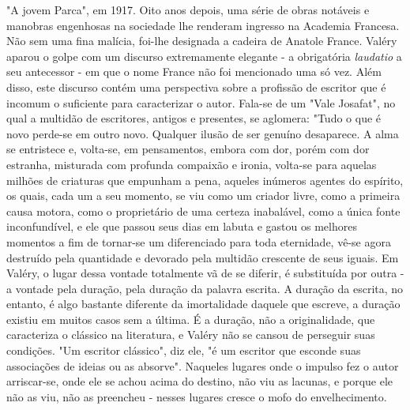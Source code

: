 "A jovem Parca", em 1917. Oito anos depois, uma série de obras notáveis
​​e manobras engenhosas na sociedade lhe renderam ingresso na Academia
Francesa. Não sem uma fina malícia, foi-lhe designada a cadeira de
Anatole France. Valéry aparou o golpe com um discurso extremamente
elegante - a obrigatória \emph{laudatio} a seu antecessor - em que o
nome France não foi mencionado uma só vez. Além disso, este discurso
contém uma perspectiva sobre a profissão de escritor que é incomum o
suficiente para caracterizar o autor. Fala-se de um "Vale Josafat", no
qual a multidão de escritores, antigos e presentes, se aglomera: "Tudo o
que é novo perde-se em outro novo. Qualquer ilusão de ser genuíno
desaparece. A alma se entristece e, volta-se, em pensamentos, embora com
dor, porém com dor estranha, misturada com profunda compaixão e ironia,
volta-se para aquelas milhões de criaturas que empunham a pena, aqueles
inúmeros agentes do espírito, os quais, cada um a seu momento, se viu
como um criador livre, como a primeira causa motora, como o proprietário
de uma certeza inabalável, como a única fonte inconfundível, e ele que
passou seus dias em labuta e gastou os melhores momentos a fim de
tornar-se um diferenciado para toda eternidade, vê-se agora destruído
pela quantidade e devorado pela multidão crescente de seus iguais. Em
Valéry, o lugar dessa vontade totalmente vã de se diferir, é substituída
por outra - a vontade pela duração, pela duração da palavra escrita. A
duração da escrita, no entanto, é algo bastante diferente da
imortalidade daquele que escreve, a duração existiu em muitos casos sem
a última. É a duração, não a originalidade, que caracteriza o clássico
na literatura, e Valéry não se cansou de perseguir suas condições. "Um
escritor clássico", diz ele, "é um escritor que esconde suas associações
de ideias ou as absorve". Naqueles lugares onde o impulso fez o autor
arriscar-se, onde ele se achou acima do destino, não viu as lacunas, e
porque ele não as viu, não as preencheu - nesses lugares cresce o mofo
do envelhecimento.

